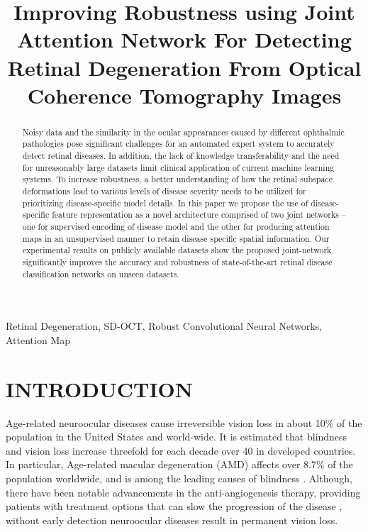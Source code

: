 \documentclass{article}
\title{Improving Robustness using Joint Attention Network For Detecting Retinal Degeneration From Optical Coherence Tomography Images}
\begin{document}
\maketitle



\begin{abstract}
Noisy data and the similarity in the ocular appearances caused by different ophthalmic pathologies pose significant challenges for an automated expert system to accurately detect retinal diseases. In addition, the lack of knowledge transferability and the need for unreasonably large datasets limit clinical application of current machine learning systems. To increase robustness, a better understanding of how the retinal subspace deformations lead to various levels of disease severity needs to be utilized for prioritizing disease-specific model details. In this paper we propose the use of disease-specific feature representation as a novel architecture comprised of two joint networks -- one for supervised encoding of disease model and the other for producing attention maps in an unsupervised manner to retain disease specific spatial information. Our experimental results on publicly available datasets show the proposed joint-network significantly improves the accuracy and robustness of state-of-the-art retinal disease classification networks on unseen datasets.


\end{abstract}

\begin{keywords}
Retinal Degeneration, SD-OCT, Robust Convolutional Neural Networks, Attention Map
\end{keywords}


\section{INTRODUCTION}
\label{sec:introduction}
Age-related neuroocular diseases cause irreversible vision loss in about 10\% of the population in the United States and world-wide. It is estimated that blindness and vision loss increase threefold for each decade over 40 in developed countries. In particular, Age-related macular degeneration (AMD) affects over 8.7\% of the population worldwide, and is among the leading causes of blindness \cite{wong2014global}. Although, there have been notable advancements in the anti-angiogenesis therapy, providing patients with treatment options that can slow the progression of the disease \cite{lim2012age}, without early detection neuroocular diseases result in permanent vision loss. 
\end{document}
